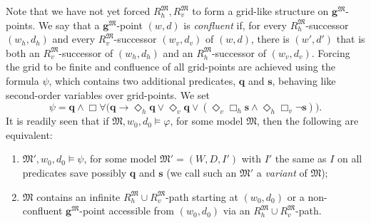 \documentclass[10pt,a4paper]{amsart}
\theoremstyle{plain}
\theoremstyle{definition}
\newcommand{\nz}[1]{\textcolor{blue}{\bf!}%
	\marginpar[\parbox{15mm}{\raggedleft\scriptsize\textcolor{blue}{#1}}]%
	{\parbox{15mm}{\raggedright\scriptsize\textcolor{blue}{#1}}}}
\newcommand{\Dht}[1]{\Diamond_h{#1}}
\newcommand{\Dvt}[1]{\Diamond_v{#1}}
\newcommand{\Bht}[1]{\Box_h{#1}}
\newcommand{\Bvt}[1]{\Box_v{#1}}
\newcommand{\ssvar}{\fform{s}}
\newcommand{\fform}[1]{\boldsymbol{#1}}
\newcommand{\qvar}{\fform{q}}
\newcommand{\gvar}{\fform{g}}
\newcommand{\ovar}{\fform{o}}
\newcommand{\Bv}{\forall}
\newcommand{\Bh}{\Box}
\begin{document}
Note that we have not yet forced $R_{h}^\mathfrak M,R_{v}^\mathfrak M$ to form a grid-like structure on $\gvar^\mathfrak M$-points. We say that a $\gvar^\mathfrak M$-point $(w,d)$ is \emph{confluent} if,  
for every $R_h^\mathfrak M$-successor $(w_h,d_h)$ and every $R_v^\mathfrak M$-successor $(w_v,d_v)$ 
of $(w,d)$, there is $(w',d')$ that is both an $R_v^\mathfrak M$-successor of $(w_h,d_h)$ and an
$R_h^\mathfrak M$-successor of $(w_v,d_v)$. 
Forcing the grid to be finite and confluence of all grid-points are
achieved using the formula $\psi$, which contains two additional predicates, $\qvar$ and $\ssvar$, behaving like second-order variables over grid-points. We set
%
$$
\psi = \qvar\land\Bh\Bv\bigl(\qvar\to 
\Dht{\qvar}\lor\Dvt\qvar\lor(\Dvt{\Bht{\ssvar}}\land\Dht{\Bvt{\neg\ssvar}})\bigr).
$$
%
%
It is readily seen that if $\mathfrak{M},w_0,d_0\models \varphi$, for some model $\mathfrak M$, then the following are equivalent: 
%
\begin{enumerate}[style=multiline,leftmargin=0.9cm]
	\item[\textbf{(c1)}] $\mathfrak{M}',w_0,d_0\models \psi$, for some model $\mathfrak M' = (W,D,I')$ with $I'$ the same as $I$ on all predicates save possibly $\qvar$ and $\ssvar$ (we call such an $\mathfrak M'$ a \emph{variant} of $\mathfrak M$);
	
	\item[\textbf{(c2)}] $\mathfrak M$ contains an infinite $R_{h}^\mathfrak M\cup R_{v}^\mathfrak M$-path starting at $(w_0,d_0)$ or a non-confluent $\gvar^\mathfrak M$-point accessible from $(w_0,d_0)$ via an $R_{h}^\mathfrak M\cup R_{v}^\mathfrak M$-path.
\end{enumerate}

\end{document}
